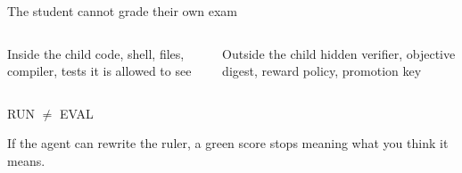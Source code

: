 \begin{frame}{The student cannot grade their own exam}
\begin{columns}[T,onlytextwidth]
\begin{block}{Inside the child}
\centering
\large code, shell, files, compiler, tests it is allowed to see
\end{block}

\vspace{0.4em}
\centering{}

\begin{block}{Outside the child}
\centering
\large hidden verifier, objective digest, reward policy, promotion key
\end{block}

\vspace{0.4em}
\centering{}
\end{columns}

\vspace{0.9em}
\begin{center}
\Huge RUN $\ne$ EVAL
\end{center}

\vspace{0.25em}
\centering\large If the agent can rewrite the ruler, a green score stops meaning what you think it means.
\end{frame}
